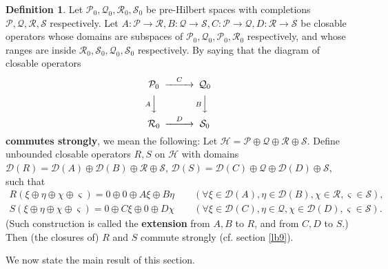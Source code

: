 \documentclass[11pt,b5paper,notitlepage]{article}
\theoremstyle{definition}
\newtheorem{df}{Definition}[subsection]
\theoremstyle{plain}
\newcommand{\mc}{\mathcal}
\newcommand{\Dom}{\scr D}
\newcommand{\scr}{\mathscr}
\numberwithin{equation}{subsection}
\begin{document}
\begin{df}\label{lb77}
	Let $\mc P_0,\mc Q_0, \mc R_0,\mc S_0$ be pre-Hilbert spaces with completions $\mc P,\mc Q,\mc R,\mc S$ respectively. Let  $A:\mc P\rightarrow\mc R,B:\mc Q\rightarrow\mc S,C:\mc P\rightarrow\mc Q,D:\mc R\rightarrow\mc S$ be closable operators whose domains are subspaces of $\mc P_0,\mc Q_0, \mc P_0,\mc R_0$ respectively, and whose ranges are inside $\mc R_0,\mc S_0,\mc Q_0,\mc S_0$ respectively. By saying that the diagram of closable operators
	\begin{align}
	\begin{CD}
	\mc P_0 @>C>> \mc Q_0\\
	@V A VV @V B VV\\
	\mc R_0 @>D>> \mc S_0
	\end{CD}
	\end{align}
	\textbf{commutes strongly}, we mean the following: Let $\mc H=\mc P\oplus\mc Q\oplus\mc R\oplus\mc S$. Define unbounded closable operators $R,S$ on $\mc H$ with domains $\Dom(R)=\Dom(A)\oplus\Dom(B)\oplus\mc R\oplus \mc S$, $\Dom(S)=\Dom(C)\oplus\mc Q\oplus\Dom(D)\oplus \mc S$, such that
	\begin{gather*}
	R(\xi\oplus\eta\oplus\chi\oplus\varsigma)=0\oplus 0\oplus A\xi\oplus B\eta\qquad(\forall \xi\in\Dom(A),\eta\in\Dom(B),\chi\in\mc R,\varsigma\in \mc S),\\
	S(\xi\oplus\eta\oplus\chi\oplus\varsigma)=0\oplus C\xi\oplus 0\oplus D\chi   \qquad(\forall \xi\in\Dom(C),\eta\in\mc Q,\chi\in \Dom(D),\varsigma\in\mc S).
	\end{gather*}
	(Such construction is called the \textbf{extension} from $A,B$ to $R$, and from $C,D$ to $S$.) Then (the closures of) $R$ and $S$ commute strongly (cf. section \ref{lb9}).
\end{df} 


We now state the main result of this section.
\end{document}

